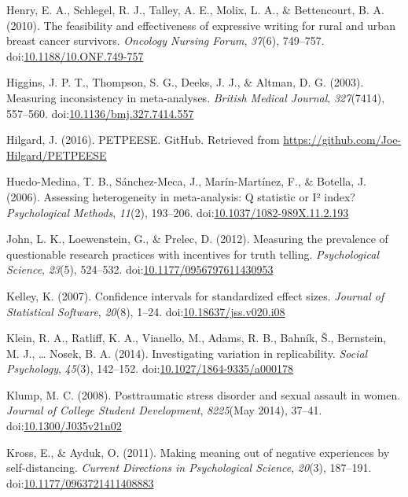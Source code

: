 \documentclass[english,man, mask]{apa6}
\theoremstyle{definition}
\theoremstyle{definition}
\theoremstyle{definition}
\theoremstyle{remark}
\begin{document}
\hypertarget{ref-Henry2010}{}
Henry, E. A., Schlegel, R. J., Talley, A. E., Molix, L. A., \&
Bettencourt, B. A. (2010). The feasibility and effectiveness of
expressive writing for rural and urban breast cancer survivors.
\emph{Oncology Nursing Forum}, \emph{37}(6), 749--757.
doi:\href{https://doi.org/10.1188/10.ONF.749-757}{10.1188/10.ONF.749-757}

\hypertarget{ref-Higgins2003}{}
Higgins, J. P. T., Thompson, S. G., Deeks, J. J., \& Altman, D. G.
(2003). Measuring inconsistency in meta-analyses. \emph{British Medical
Journal}, \emph{327}(7414), 557--560.
doi:\href{https://doi.org/10.1136/bmj.327.7414.557}{10.1136/bmj.327.7414.557}

\hypertarget{ref-Hilgard2016}{}
Hilgard, J. (2016). PETPEESE. GitHub. Retrieved from
\url{https://github.com/Joe-Hilgard/PETPEESE}

\hypertarget{ref-Huedo-Medina2006}{}
Huedo-Medina, T. B., Sánchez-Meca, J., Marín-Martínez, F., \& Botella,
J. (2006). Assessing heterogeneity in meta-analysis: Q statistic or I²
index? \emph{Psychological Methods}, \emph{11}(2), 193--206.
doi:\href{https://doi.org/10.1037/1082-989X.11.2.193}{10.1037/1082-989X.11.2.193}

\hypertarget{ref-John2012}{}
John, L. K., Loewenstein, G., \& Prelec, D. (2012). Measuring the
prevalence of questionable research practices with incentives for truth
telling. \emph{Psychological Science}, \emph{23}(5), 524--532.
doi:\href{https://doi.org/10.1177/0956797611430953}{10.1177/0956797611430953}

\hypertarget{ref-Kelley2007}{}
Kelley, K. (2007). Confidence intervals for standardized effect sizes.
\emph{Journal of Statistical Software}, \emph{20}(8), 1--24.
doi:\href{https://doi.org/10.18637/jss.v020.i08}{10.18637/jss.v020.i08}

\hypertarget{ref-Klein2014a}{}
Klein, R. A., Ratliff, K. A., Vianello, M., Adams, R. B., Bahník, Š.,
Bernstein, M. J., \ldots{} Nosek, B. A. (2014). Investigating variation
in replicability. \emph{Social Psychology}, \emph{45}(3), 142--152.
doi:\href{https://doi.org/10.1027/1864-9335/a000178}{10.1027/1864-9335/a000178}

\hypertarget{ref-Klump2008}{}
Klump, M. C. (2008). Posttraumatic stress disorder and sexual assault in
women. \emph{Journal of College Student Development}, \emph{8225}(May
2014), 37--41.
doi:\href{https://doi.org/10.1300/J035v21n02}{10.1300/J035v21n02}

\hypertarget{ref-Kross2011}{}
Kross, E., \& Ayduk, O. (2011). Making meaning out of negative
experiences by self-distancing. \emph{Current Directions in
Psychological Science}, \emph{20}(3), 187--191.
doi:\href{https://doi.org/10.1177/0963721411408883}{10.1177/0963721411408883}
\end{document}
